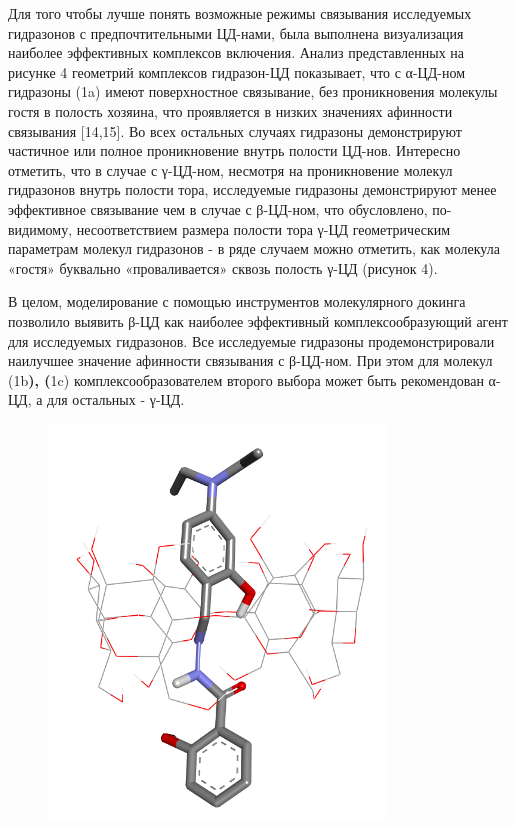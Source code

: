 Для того чтобы лучше понять возможные режимы связывания исследуемых
гидразонов с предпочтительными ЦД-нами, была выполнена визуализация
наиболее эффективных комплексов включения. Анализ представленных на
рисунке 4 геометрий комплексов гидразон-ЦД показывает, что с α-ЦД-ном
гидразоны (1a) имеют поверхностное связывание, без проникновения
молекулы гостя в полость хозяина, что проявляется в низких значениях
афинности связывания {[}14,15{]}. Во всех остальных случаях гидразоны
демонстрируют частичное или полное проникновение внутрь полости ЦД-нов.
Интересно отметить, что в случае с γ-ЦД-ном, несмотря на проникновение
молекул гидразонов внутрь полости тора, исследуемые гидразоны
демонстрируют менее эффективное связывание чем в случае с β-ЦД-ном, что
обусловлено, по-видимому, несоответствием размера полости тора γ-ЦД
геометрическим параметрам молекул гидразонов - в ряде случаем можно
отметить, как молекула «гостя» буквально «проваливается» сквозь полость
γ-ЦД (рисунок 4).

В целом, моделирование с помощью инструментов молекулярного докинга
позволило выявить β-ЦД как наиболее эффективный комплексообразующий
агент для исследуемых гидразонов. Все исследуемые гидразоны
продемонстрировали наилучшее значение афинности связывания с β-ЦД-ном.
При этом для молекул (1b{\bfseries ), (}1c) комплексообразователем
второго выбора может быть рекомендован α-ЦД, а для остальных - γ-ЦД.

\begin{figure}[H]
	\centering
	\includegraphics[width=0.8\textwidth]{media/chem2/image55}
	\caption*{}
\end{figure}

